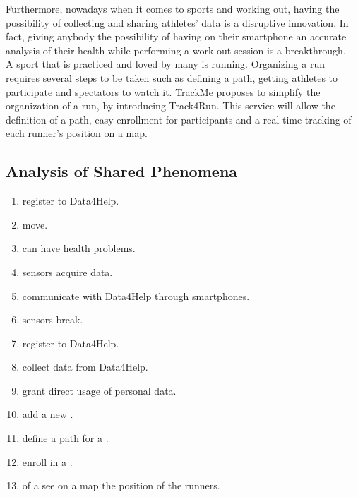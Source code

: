 \documentclass[../../rasd.tex]{subfiles}
\begin{document}
Furthermore, nowadays when it comes to sports and working out, having the possibility of collecting and sharing athletes' data is a disruptive innovation. In fact, giving anybody the possibility of having on their smartphone an accurate analysis of their health while performing a work out session is a breakthrough.\\
A sport that is practiced and loved by many is running. Organizing a run requires several steps to be taken such as defining a path, getting athletes to participate and spectators to watch it. TrackMe proposes to simplify the organization of a run, by introducing Track4Run. This service will allow the definition of a path, easy enrollment for participants and a real-time tracking of each runner’s position on a map.


\subsection{Analysis of Shared Phenomena}


\begin{enumerate}
	\item {} register to Data4Help.
	\item {} move.
	\item {} can have health problems.
	\item {} sensors acquire data.
	\item {} communicate with Data4Help through smartphones.
	\item {} sensors break.
	\item {} register to Data4Help.
	\item {} collect data from Data4Help.
	\item {} grant direct usage of personal data.
	\item {} add a new .
	\item {} define a path for a .
	\item {} enroll in a .
	\item {} of a  see on a map the position of the runners.
\end{enumerate}
\end{document}
